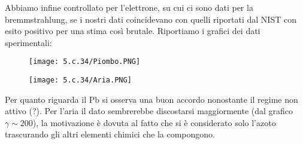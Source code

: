 \documentclass[twoside]{article}
\begin{document}
\newpage
Abbiamo infine controllato per l'elettrone, su cui ci sono dati per la bremmstrahlung,
se i nostri dati coincidevano con quelli riportati dal NIST con esito positivo per una stima così brutale. Riportiamo i grafici dei dati sperimentali:
\begin{figure}[H]
    \centering
    \texttt{[image: 5.c.34/Piombo.PNG]}
    \label{fig:nist_pb}
\end{figure}
\begin{figure}[H]
    \centering
    \texttt{[image: 5.c.34/Aria.PNG]}
    \label{fig:nist_air}
\end{figure}
Per quanto riguarda il Pb si osserva una buon accordo nonostante il regime non attivo (?). Per l'aria il dato sembrerebbe discostarsi maggiormente (dal grafico $\gamma\sim 200$), la motivazione è dovuta al fatto che si è considerato solo l'azoto trascurando gli altri elementi chimici che la compongono.
\end{document}
